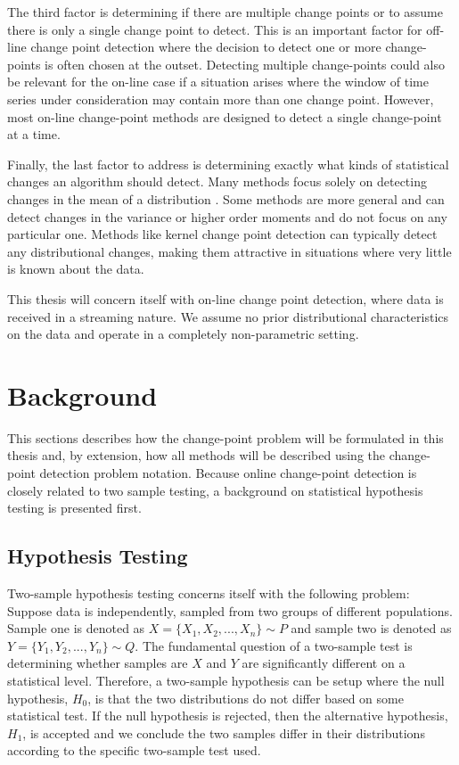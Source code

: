 The third factor is determining if there are multiple change points or to assume there is only a single change point to detect. This is an important  factor for off-line change point detection where the decision to detect one or more change-points is often chosen at the outset.  Detecting multiple change-points could also be relevant for the on-line case if a situation arises where the window of time series under consideration may contain more than one change point. However, most on-line change-point methods are designed to detect a single change-point at a time.

Finally, the last factor to address is determining exactly what kinds of statistical changes an algorithm should detect. Many methods focus solely on detecting changes in the mean of a distribution \cite{lee2010change}. Some methods are more general and can detect changes in the variance or higher order moments and do not focus on any particular one. Methods like kernel change point detection can typically detect any distributional changes, making them attractive in situations where very little is known about the data.

This thesis will concern itself with on-line change point detection, where data is received in a streaming nature. We assume no prior distributional characteristics on the data and operate in a completely non-parametric setting. 

\section{Background}
This sections describes how the change-point problem will be formulated in this thesis and, by extension, how all methods will be described using the change-point detection problem notation. Because online change-point detection is closely related to two sample testing, a background on statistical hypothesis testing is presented first. 

\subsection{Hypothesis Testing}

Two-sample hypothesis testing concerns itself with the following problem: Suppose data is independently, sampled from two groups of different populations. Sample one is denoted as  $X=\{X_1, X_2, ...,X_n\} \sim P$ and sample two is denoted as $Y=\{Y_1, Y_2, ...,Y_n\} \sim Q$. The fundamental question of a two-sample test is determining whether samples are $X$ and $Y$ are significantly different on a statistical level. Therefore, a two-sample hypothesis can be setup where the null hypothesis, $H_0$, is that the two distributions do not differ based on some statistical test. If the null hypothesis is rejected, then the alternative hypothesis, $H_1$, is accepted and we conclude the two samples differ in their distributions according to the specific two-sample test used.

